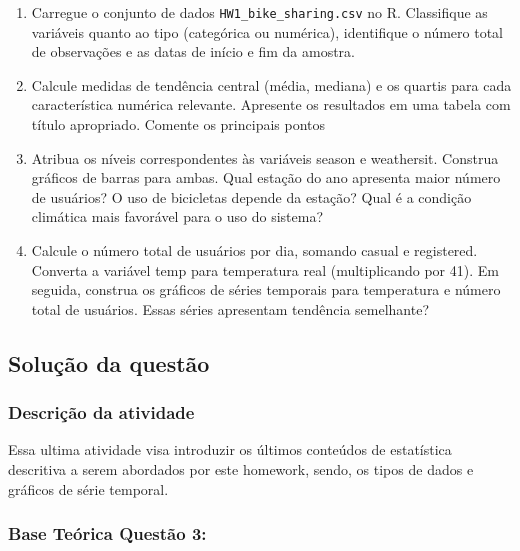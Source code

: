 \documentclass[a4paper,11pt]{article}
\begin{document}
\begin{enumerate}[leftmargin=*]
\item Carregue o conjunto de dados \texttt{HW1\_bike\_sharing.csv}  no R. Classifique as variáveis quanto ao tipo (categórica ou numérica), identifique o número total de observações e as datas de início e fim da amostra.

\item Calcule medidas de tendência central (média, mediana) e os quartis para cada característica numérica relevante. Apresente os resultados em uma tabela com título
apropriado. Comente os principais pontos

\item Atribua os níveis correspondentes às variáveis season e weathersit. Construa gráficos de barras para ambas. Qual estação do ano apresenta maior número de usuários? O uso de bicicletas depende da estação? Qual é a condição climática mais favorável para o uso do sistema?

\item Calcule o número total de usuários por dia, somando casual e registered. Converta
a variável temp para temperatura real (multiplicando por 41). Em seguida, construa os gráficos de séries temporais para temperatura e número total de usuários. Essas séries apresentam tendência semelhante?

\end{enumerate}

\subsection*{Solução da questão} 					

\subsubsection*{Descrição da atividade}
Essa ultima atividade visa introduzir os últimos conteúdos de estatística descritiva  a serem abordados por este homework, sendo, os tipos de dados e gráficos de série temporal.


\subsubsection*{Base Teórica Questão 3:} 
\end{document}
